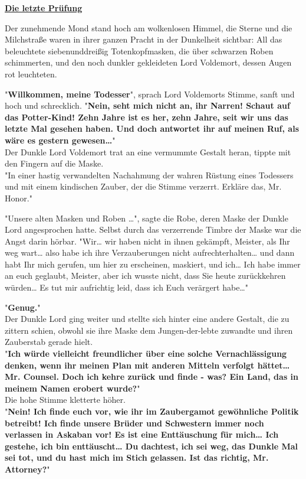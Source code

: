 

\hypertarget{die-letzte-pruxfcfung}{%

\textbf{\uline{Die letzte Prüfung}}

Der zunehmende Mond stand hoch am wolkenlosen Himmel, die Sterne und die Milchstraße waren in ihrer ganzen Pracht in der Dunkelheit sichtbar: All das beleuchtete siebenunddreißig Totenkopfmasken, die über schwarzen Roben schimmerten, und den noch dunkler gekleideten Lord Voldemort, dessen Augen rot leuchteten.

"\textbf{Willkommen, meine Todesser}", sprach Lord Voldemorts Stimme, sanft und hoch und schrecklich. "\textbf{Nein, seht mich nicht an, ihr Narren! Schaut auf das Potter-Kind! Zehn Jahre ist es her, zehn Jahre, seit wir uns das letzte Mal gesehen haben. Und doch antwortet ihr auf meinen Ruf, als wäre es gestern gewesen…}"\\ Der Dunkle Lord Voldemort trat an eine vermummte Gestalt heran, tippte mit den Fingern auf die Maske.\\ "In einer hastig verwandelten Nachahmung der wahren Rüstung eines Todessers und mit einem kindischen Zauber, der die Stimme verzerrt. Erkläre das, Mr. Honor."

"Unsere alten Masken und Roben …", sagte die Robe, deren Maske der Dunkle Lord angesprochen hatte. Selbst durch das verzerrende Timbre der Maske war die Angst darin hörbar. "Wir… wir haben nicht in ihnen gekämpft, Meister, als Ihr weg wart… also habe ich ihre Verzauberungen nicht aufrechterhalten… und dann habt Ihr mich gerufen, um hier zu erscheinen, maskiert, und ich… Ich habe immer an euch geglaubt, Meister, aber ich wusste nicht, dass Sie heute zurückkehren würden… Es tut mir aufrichtig leid, dass ich Euch verärgert habe…"

"\textbf{Genug.}"\\ Der Dunkle Lord ging weiter und stellte sich hinter eine andere Gestalt, die zu zittern schien, obwohl sie ihre Maske dem Jungen-der-lebte zuwandte und ihren Zauberstab gerade hielt.\\ "\textbf{Ich würde vielleicht freundlicher über eine solche Vernachlässigung denken, wenn ihr meinen Plan mit anderen Mitteln verfolgt hättet… Mr. Counsel. Doch ich kehre zurück und finde - was? Ein Land, das in meinem Namen erobert wurde?}"\\ Die hohe Stimme kletterte höher.\\ "\textbf{Nein! Ich finde euch vor, wie ihr im Zaubergamot gewöhnliche Politik betreibt! Ich finde unsere Brüder und Schwestern immer noch verlassen in Askaban vor! Es ist eine Enttäuschung für mich… Ich gestehe, ich bin enttäuscht… Du dachtest, ich sei weg, das Dunkle Mal sei tot, und du hast mich im Stich gelassen. Ist das richtig, Mr. Attorney?}"

}
